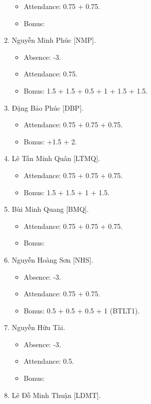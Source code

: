 \documentclass{article}
\begin{document}
\begin{enumerate}
\begin{itemize}
        \item Attendance: 0.75 + 0.75.
        \item Bonus:
    \end{itemize}
    \item {\sc Nguyễn Minh Phúc [NMP].}
    \begin{itemize}
        \item Absence: -3.
        \item Attendance: 0.75.
        \item Bonus: 1.5 + 1.5 + 0.5 + 1 + 1.5 + 1.5.
    \end{itemize}
    \item {\sc Đặng Bảo Phúc [DBP].}
    \begin{itemize}
        \item Attendance: 0.75 + 0.75 + 0.75.
        \item Bonus: +1.5 + 2.
    \end{itemize}
    \item {\sc Lê Tấn Minh Quân [LTMQ].}
    \begin{itemize}
        \item Attendance: 0.75 + 0.75 + 0.75.
        \item Bonus: 1.5 + 1.5 + 1 + 1.5.
    \end{itemize}
    \item {\sc Bùi Minh Quang [BMQ].}
    \begin{itemize}
        \item Attendance: 0.75 + 0.75 + 0.75.
        \item Bonus:
    \end{itemize}
    \item {\sc Nguyễn Hoàng Sơn [NHS].}
    \begin{itemize}
        \item Absence: -3.
        \item Attendance: 0.75 + 0.75.
        \item Bonus: 0.5 + 0.5 + 0.5 + 1 (BTLT1).
    \end{itemize}
    \item {\sc Nguyễn Hữu Tài.}
    \begin{itemize}
        \item Absence: -3.
        \item Attendance: 0.5.
        \item Bonus:
    \end{itemize}
    \item {\sc Lê Đỗ Minh Thuận [LDMT].}
    \begin{itemize}

\end{itemize}
\end{enumerate}
\end{document}
